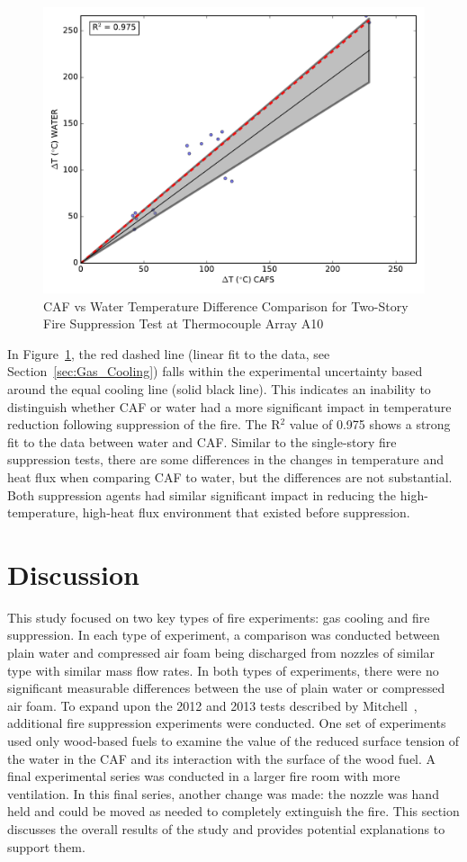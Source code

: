 \documentclass[12pt,oneside]{book}
\begin{document}
\begin{figure}[!ht]
	\includegraphics[width=.7\columnwidth]{../Figures/Script_Figures/TC_A10_scatter}
	\caption{CAF vs Water Temperature Difference Comparison for Two-Story Fire Suppression Test at Thermocouple Array A10}
	\label{fig:fs_a10}
\end{figure}

In Figure~\ref{fig:fs_a10}, the red dashed line (linear fit to the data, see Section~\ref{sec:Gas_Cooling}) falls within the experimental uncertainty based around the equal cooling line (solid black line). This indicates an inability to distinguish whether CAF or water had a more significant impact in temperature reduction following suppression of the fire. The R$^2$ value of 0.975 shows a strong fit to the data between water and CAF. Similar to the single-story fire suppression tests, there are some differences in the changes in temperature and heat flux when comparing CAF to water, but the differences are not substantial. Both suppression agents had similar significant impact in reducing the high-temperature, high-heat flux environment that existed before suppression. 

\chapter{Discussion}
\label{chap:Discussion}

This study focused on two key types of fire experiments: gas cooling and fire suppression. In each type of experiment, a comparison was conducted between plain water and compressed air foam being discharged from nozzles of similar type with similar mass flow rates. In both types of experiments, there were no significant measurable differences between the use of plain water or compressed air foam. To expand upon the 2012 and 2013 tests described by Mitchell~\cite{Mitchell:1}, additional fire suppression experiments were conducted. One set of experiments used only wood-based fuels to examine the value of the reduced surface tension of the water in the CAF and its interaction with the surface of the wood fuel. A final experimental series was conducted in a larger fire room with more ventilation. In this final series, another change was made: the nozzle was hand held and could be moved as needed to completely extinguish the fire. This section discusses the overall results of the study and provides potential explanations to support them.
\end{document}
